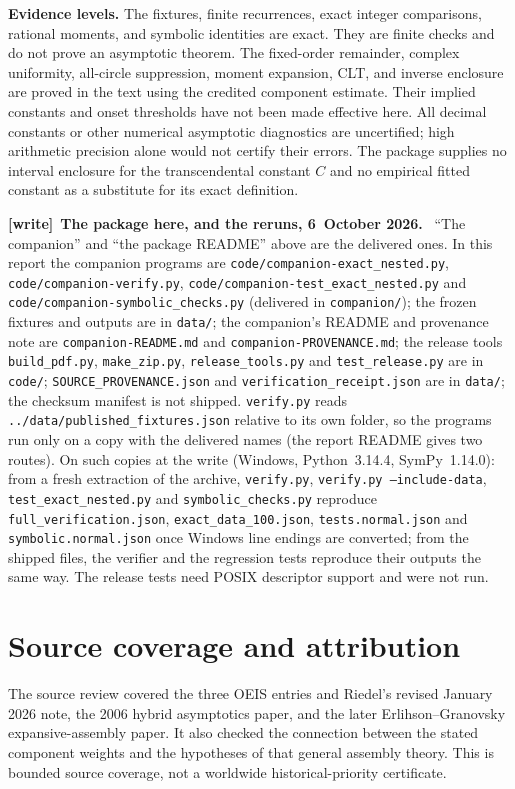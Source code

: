 \documentclass[11pt,letterpaper]{article}
\numberwithin{equation}{section}
\theoremstyle{remark}\newtheorem{remark}[theorem]{Remark}
\newcommand{\file}[1]{\nolinkurl{#1}}
\newenvironment{writenote}[1][]{\par\smallskip\begingroup\small
 \noindent\textbf{[write]}\if\relax\detokenize{#1}\relax\else~\textbf{#1.}\fi\ }%
 {\par\endgroup\smallskip}
\theoremstyle{definition}\newtheorem{definition}[theorem]{Definition}\theoremstyle{plain}
\begin{document}
\textbf{Evidence levels.} The fixtures, finite recurrences, exact
integer comparisons, rational moments, and symbolic identities are
exact. They are finite checks and do not prove an asymptotic theorem.
The fixed-order remainder, complex uniformity, all-circle suppression,
moment expansion, CLT, and inverse enclosure are proved in the text
using the credited component estimate. Their implied constants and
onset thresholds have not been made effective here. All decimal
constants or other numerical asymptotic diagnostics are uncertified;
high arithmetic precision alone would not certify their errors.
The package supplies no interval enclosure for the transcendental
constant $C$ and no empirical fitted constant as a substitute for its
exact definition.

\begin{writenote}[The package here, and the reruns, 6~October 2026]
``The companion'' and ``the package README'' above are the delivered ones. In
this report the companion programs are
\file{code/companion-exact_nested.py}, \file{code/companion-verify.py},
\file{code/companion-test_exact_nested.py} and
\file{code/companion-symbolic_checks.py} (delivered in \file{companion/});
the frozen fixtures and outputs are in \file{data/}; the companion's README
and provenance note are \file{companion-README.md} and
\file{companion-PROVENANCE.md}; the release tools \file{build_pdf.py},
\file{make_zip.py}, \file{release_tools.py} and \file{test_release.py} are in
\file{code/}; \file{SOURCE_PROVENANCE.json} and
\file{verification_receipt.json} are in \file{data/}; the checksum manifest
is not shipped. \file{verify.py} reads \file{../data/published_fixtures.json}
relative to its own folder, so the programs run only on a copy with the
delivered names (the report README gives two routes). On such copies at the
write (Windows, Python~3.14.4, SymPy~1.14.0): from a fresh extraction of the
archive, \texttt{verify.py}, \texttt{verify.py --include-data},
\texttt{test\_exact\_nested.py} and \texttt{symbolic\_checks.py} reproduce
\file{full_verification.json}, \file{exact_data_100.json},
\file{tests.normal.json} and \file{symbolic.normal.json} once Windows line
endings are converted; from the shipped files, the verifier and the
regression tests reproduce their outputs the same way. The release tests need
POSIX descriptor support and were not run.
\end{writenote}

\section{Source coverage and attribution}\label{ncy:sec:sources}
The source review covered the three OEIS entries and Riedel's revised
January 2026 note, the 2006 hybrid asymptotics paper, and the later
Erlihson--Granovsky expansive-assembly paper. It also checked the
connection between the stated component weights and the hypotheses
of that general assembly theory. This is bounded source coverage,
not a worldwide historical-priority certificate.
\end{document}

